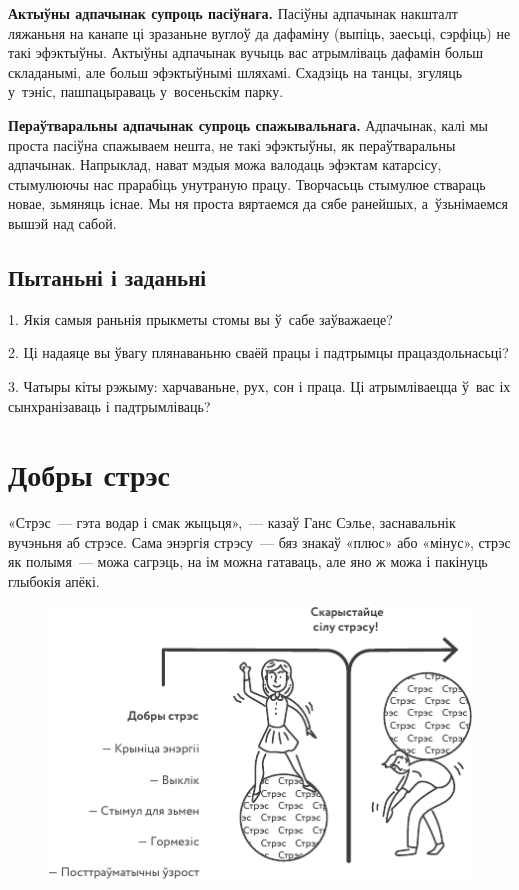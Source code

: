 \textbf{Актыўны адпачынак супроць пасіўнага.} Пасіўны адпачынак накшталт ляжаньня на канапе ці зразаньне вуглоў да дафаміну (выпіць, заесьці, сэрфіць) не такі эфэктыўны. Актыўны адпачынак вучыць вас атрымліваць дафамін больш складанымі, але больш эфэктыўнымі шляхамі. Схадзіць на танцы, згуляць у~тэніс, пашпацыраваць у~восеньскім парку.

\textbf{Пераўтваральны адпачынак супроць спажывальнага.} Адпачынак, калі мы проста пасіўна спажываем нешта, не такі эфэктыўны, як пераўтваральны адпачынак. Напрыклад, нават мэдыя можа валодаць эфэктам катарсісу, стымулюючы нас прарабіць унутраную працу. Творчасьць стымулюе ствараць новае, зьмяняць існае. Мы ня проста вяртаемся да сябе ранейшых, а~ўзьнімаемся вышэй над сабой.

\subsection*{Пытаньні і заданьні}

1. Якія самыя раньнія прыкметы стомы вы ў~сабе заўважаеце?

2. Ці надаяце вы ўвагу плянаваньню сваёй працы і падтрымцы працаздольнасьці?

3. Чатыры кіты рэжыму: харчаваньне, рух, сон і праца. Ці атрымліваецца ў~вас іх сынхранізаваць і падтрымліваць?


\section{Добры стрэс}

«Стрэс~--- гэта водар і смак жыцьця»,~--- казаў Ганс Сэлье, заснавальнік вучэньня аб стрэсе. Сама энэргія стрэсу~--- бяз знакаў «плюс» або «мінус», стрэс як полымя~--- можа сагрэць, на ім можна гатаваць, але яно ж можа і пакінуць глыбокія апёкі. 

\begin{figure}[htb!]
  \centering
  \includegraphics[scale=1.5]{willpower/ch7/11.pdf}
\end{figure}

